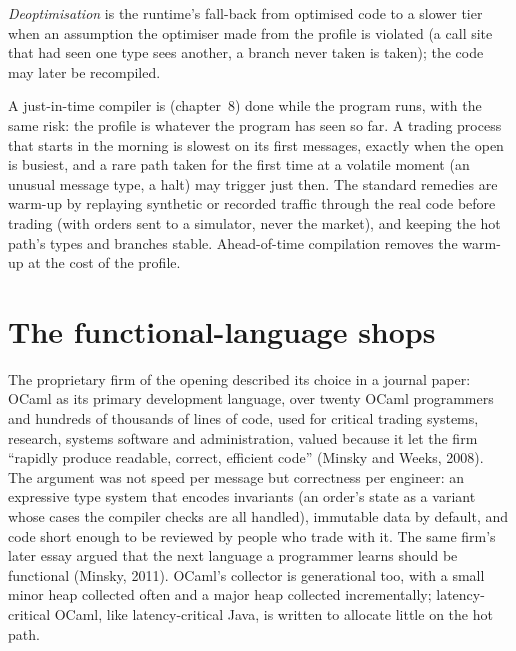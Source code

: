\begin{definition}[Deoptimisation]\label{def:ll:managed-and-functional-languages-on-the-desk:deopt}
\emph{Deoptimisation} is the runtime's fall-back from optimised code to a slower tier when an
assumption the optimiser made from the profile is violated (a call site that had seen one type sees another, a branch never
taken is taken); the code may later be recompiled.
\end{definition}

A just-in-time compiler is  (chapter~8) done while the program runs, with the same risk: the
profile is whatever the program has seen so far. A trading process that starts in the morning is slowest on its first
messages, exactly when the open is busiest, and a rare path taken for the first time at a volatile moment (an unusual
message type, a halt) may trigger  just then. The standard remedies are warm-up by replaying synthetic or
recorded traffic through the real code before trading (with orders sent to a simulator, never the market), and keeping
the hot path's types and branches stable. Ahead-of-time compilation removes the warm-up at the cost of the profile.

\section{The functional-language shops}

The proprietary firm of the opening described its choice in a journal paper: OCaml as its primary development language,
over twenty OCaml programmers and hundreds of thousands of lines of code, used for critical trading systems, research,
systems software and administration, valued because it let the firm ``rapidly produce readable, correct, efficient code''
(Minsky and Weeks, 2008). The argument was not speed per message but correctness per engineer: an expressive type system
that encodes invariants (an order's state as a variant whose cases the compiler checks are all handled), immutable data by
default, and code short enough to be reviewed by people who trade with it. The same firm's later essay argued that the
next language a programmer learns should be functional (Minsky, 2011). OCaml's collector is generational too, with a small
minor heap collected often and a major heap collected incrementally; latency-critical OCaml, like latency-critical
Java, is written to allocate little on the hot path.

